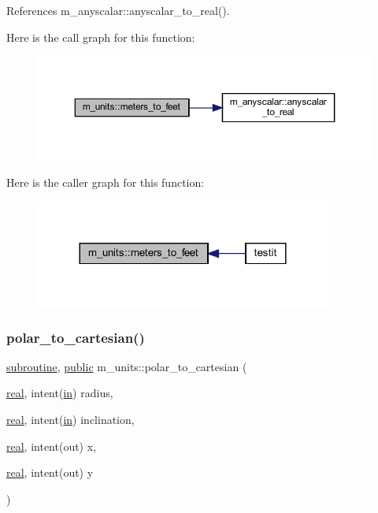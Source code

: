 References m\+\_\+anyscalar\+::anyscalar\+\_\+to\+\_\+real().

Here is the call graph for this function\+:
\nopagebreak
\begin{figure}[H]
\begin{center}
\leavevmode
\includegraphics[width=350pt]{namespacem__units_a0ac5ab49814761420953eb6b859c80fd_cgraph}
\end{center}
\end{figure}
Here is the caller graph for this function\+:
\nopagebreak
\begin{figure}[H]
\begin{center}
\leavevmode
\includegraphics[width=276pt]{namespacem__units_a0ac5ab49814761420953eb6b859c80fd_icgraph}
\end{center}
\end{figure}
\mbox{\label{namespacem__units_aa8b818c6ad24272b8c946b497041edc9}} 
\subsubsection{\texorpdfstring{polar\+\_\+to\+\_\+cartesian()}{polar\_to\_cartesian()}}
{\footnotesize\ttfamily \hyperlink{M__stopwatch_83_8txt_acfbcff50169d691ff02d4a123ed70482}{subroutine}, \hyperlink{M__stopwatch_83_8txt_a2f74811300c361e53b430611a7d1769f}{public} m\+\_\+units\+::polar\+\_\+to\+\_\+cartesian (\begin{DoxyParamCaption}\item[{\hyperlink{read__watch_83_8txt_abdb62bde002f38ef75f810d3a905a823}{real}, intent(\hyperlink{M__journal_83_8txt_afce72651d1eed785a2132bee863b2f38}{in})}]{radius,  }\item[{\hyperlink{read__watch_83_8txt_abdb62bde002f38ef75f810d3a905a823}{real}, intent(\hyperlink{M__journal_83_8txt_afce72651d1eed785a2132bee863b2f38}{in})}]{inclination,  }\item[{\hyperlink{read__watch_83_8txt_abdb62bde002f38ef75f810d3a905a823}{real}, intent(out)}]{x,  }\item[{\hyperlink{read__watch_83_8txt_abdb62bde002f38ef75f810d3a905a823}{real}, intent(out)}]{y }\end{DoxyParamCaption})}



